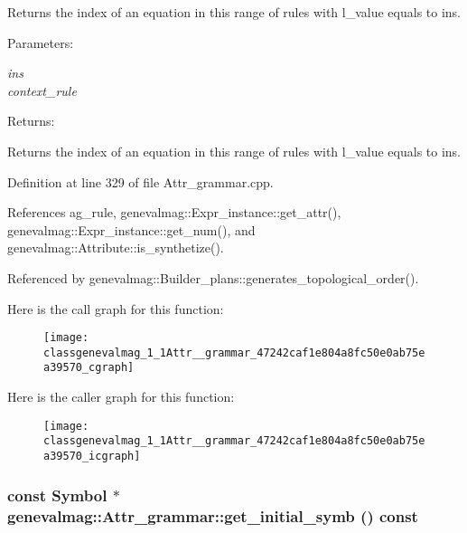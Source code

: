 Returns the index of an equation in this range of rules with l\_\-value equals to ins. \begin{Desc}
\item[Parameters:]
\begin{description}
\item[{\em ins}]\item[{\em context\_\-rule}]\end{description}
\end{Desc}
\begin{Desc}
\item[Returns:]\end{Desc}
Returns the index of an equation in this range of rules with l\_\-value equals to ins. 

Definition at line 329 of file Attr\_\-grammar.cpp.

References ag\_\-rule, genevalmag::Expr\_\-instance::get\_\-attr(), genevalmag::Expr\_\-instance::get\_\-num(), and genevalmag::Attribute::is\_\-synthetize().

Referenced by genevalmag::Builder\_\-plans::generates\_\-topological\_\-order().

Here is the call graph for this function:\nopagebreak
\begin{figure}[H]
\begin{center}
\leavevmode
\texttt{[image: classgenevalmag\_1\_1Attr\_\_grammar\_47242caf1e804a8fc50e0ab75ea39570\_cgraph]}
\end{center}
\end{figure}


Here is the caller graph for this function:\nopagebreak
\begin{figure}[H]
\begin{center}
\leavevmode
\texttt{[image: classgenevalmag\_1\_1Attr\_\_grammar\_47242caf1e804a8fc50e0ab75ea39570\_icgraph]}
\end{center}
\end{figure}
\hypertarget{classgenevalmag_1_1Attr__grammar_5a476aa583e3f9e1bbfe182b5ee2f759}{
\subsubsection[{get\_\-initial\_\-symb}]{\setlength{\rightskip}{0pt plus 5cm}const {\bf Symbol} $\ast$ genevalmag::Attr\_\-grammar::get\_\-initial\_\-symb () const}}
\label{classgenevalmag_1_1Attr__grammar_5a476aa583e3f9e1bbfe182b5ee2f759}


